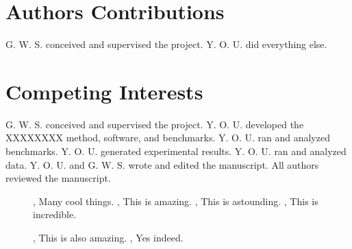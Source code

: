 \begin{refsegment}
\section*{Authors Contributions}

G. W. S. conceived and supervised the project. Y. O. U. did everything else.

\section*{Competing Interests}

G. W. S. conceived and supervised the project. Y. O. U. developed the XXXXXXXX
method, software, and benchmarks. Y. O. U. ran and analyzed benchmarks. Y. O. U.
generated experimental results. Y. O. U. ran and analyzed data. Y. O. U. and G.
W. S. wrote and edited the manuscript. All authors reviewed the manuscript.

\clearpage

\end{refsegment}
\printbibliography[segment=1]

\clearpage

\begin{figure}[htbp]
\centering

\end{figure}

\clearpage

\begin{figure}[htbp]
  {\label{fig:amazing}}
  {\label{fig:astounding}}
  {\label{fig:incredible}}
  \caption{, Many cool things.
    , This is amazing. , This
    is astounding. , This is incredible.
  \label{fig:incredibleOne}}
\end{figure}

\clearpage

\begin{figure}[htbp]
\centering

\end{figure}

\clearpage

\begin{figure}[htbp]
  {\label{fig:anotherAmazing}}
  {\label{fig:anotherWow}}
  \caption{, This is also amazing.
    , Yes indeed.
  \label{fig:astoundingOne}}
\end{figure}

